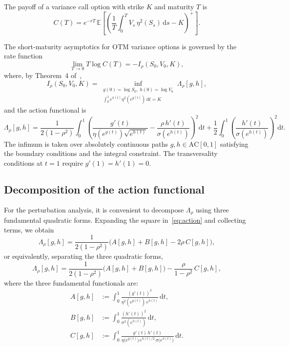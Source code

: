 \documentclass[11pt]{article}
\theoremstyle{definition}
\newcommand{\dd}{\mathrm{d}}
\newcommand{\E}{\mathbb{E}}
\newcommand{\AC}{\mathrm{AC}}
\begin{document}
\noindent The payoff of a variance call option with strike $K$ and maturity $T$ is
\begin{equation}\label{eq:payoff}
  C(T) = e^{-rT}\,\E\!\left[\left(\frac{1}{T}\int_0^T V_s\,\eta^2(S_s)\,\dd s - K\right)^{\!+}\right].
\end{equation}

The short-maturity asymptotics for OTM variance options is governed by the rate function
\begin{equation}\label{eq:rate_fn}
  \lim_{T \to 0} T\log C(T) = -I_\rho(S_0, V_0, K),
\end{equation}
where, by Theorem~4 of~\cite{PWZ2025},
\begin{equation}\label{eq:variational}
  I_\rho(S_0, V_0, K) = \inf_{\substack{g(0) = \log S_0,\; h(0) = \log V_0 \\ \int_0^1 e^{h(t)}\eta^2(e^{g(t)})\,\dd t = K}} \Lambda_\rho[g,h],
\end{equation}
and the action functional is
\begin{equation}\label{eq:action}
  \Lambda_\rho[g,h] = \frac{1}{2(1-\rho^2)}\int_0^1 \!\left(\frac{g'(t)}{\eta(e^{g(t)})\sqrt{e^{h(t)}}} - \frac{\rho\, h'(t)}{\sigma(e^{h(t)})}\right)^{\!2}\dd t + \frac{1}{2}\int_0^1\!\left(\frac{h'(t)}{\sigma(e^{h(t)})}\right)^{\!2}\dd t.
\end{equation}
The infimum is taken over absolutely continuous paths $g, h \in \AC[0,1]$ satisfying the boundary conditions and the integral constraint. The transversality conditions at $t=1$ require $g'(1) = h'(1) = 0$.

\subsection{Decomposition of the action functional}

For the perturbation analysis, it is convenient to decompose $\Lambda_\rho$ using three fundamental quadratic forms. Expanding the square in~\eqref{eq:action} and collecting terms, we obtain
\begin{equation}\label{eq:decomp}
  \Lambda_\rho[g,h] = \frac{1}{2(1-\rho^2)}\bigl(A[g,h] + B[g,h] - 2\rho\,C[g,h]\bigr),
\end{equation}
or equivalently, separating the three quadratic forms,
\begin{equation}\label{eq:decomp_expanded}
  \Lambda_\rho[g,h] = \frac{1}{2(1-\rho^2)}\bigl(A[g,h] + B[g,h]\bigr) - \frac{\rho}{1-\rho^2}\,C[g,h],
\end{equation}
where the three fundamental functionals are:
\begin{align}
  A[g,h] &:= \int_0^1 \frac{(g'(t))^2}{\eta^2(e^{g(t)})\,e^{h(t)}}\,\dd t, \label{eq:A_def}\\
  B[g,h] &:= \int_0^1 \frac{(h'(t))^2}{\sigma^2(e^{h(t)})}\,\dd t, \label{eq:B_def}\\
  C[g,h] &:= \int_0^1 \frac{g'(t)\,h'(t)}{\eta\bigl(e^{g(t)}\bigr)\,e^{h(t)/2}\,\sigma\bigl(e^{h(t)}\bigr)}\,\dd t. \label{eq:C_def}
\end{align}
\end{document}
